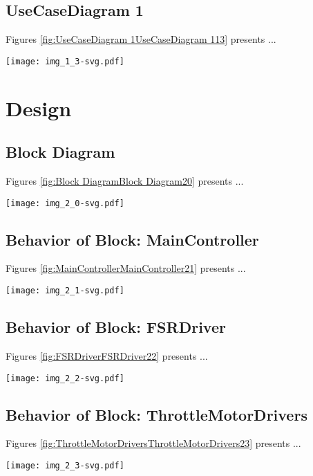 \subsection{UseCaseDiagram 1}
Figures \ref{fig:UseCaseDiagram 1UseCaseDiagram 113} presents ...
\begin{figure*}[htb]
\centering
\texttt{[image: img\_1\_3-svg.pdf]}
\caption{Diagram "UseCaseDiagram 1"}
\label{fig:UseCaseDiagram 1UseCaseDiagram 113}
\end{figure*}

\section{Design}
\subsection{Block Diagram}
Figures \ref{fig:Block DiagramBlock Diagram20} presents ...
\begin{figure*}[htb]
\centering
\texttt{[image: img\_2\_0-svg.pdf]}
\caption{Diagram "Block Diagram"}
\label{fig:Block DiagramBlock Diagram20}
\end{figure*}

\subsection{Behavior of Block: MainController}
Figures \ref{fig:MainControllerMainController21} presents ...
\begin{figure*}[htb]
\centering
\texttt{[image: img\_2\_1-svg.pdf]}
\caption{Diagram "Behavior of Block: MainController"}
\label{fig:MainControllerMainController21}
\end{figure*}

\subsection{Behavior of Block: FSRDriver}
Figures \ref{fig:FSRDriverFSRDriver22} presents ...
\begin{figure*}[htb]
\centering
\texttt{[image: img\_2\_2-svg.pdf]}
\caption{Diagram "Behavior of Block: FSRDriver"}
\label{fig:FSRDriverFSRDriver22}
\end{figure*}

\subsection{Behavior of Block: ThrottleMotorDrivers}
Figures \ref{fig:ThrottleMotorDriversThrottleMotorDrivers23} presents ...
\begin{figure*}[htb]
\centering
\texttt{[image: img\_2\_3-svg.pdf]}
\caption{Diagram "Behavior of Block: ThrottleMotorDrivers"}
\label{fig:ThrottleMotorDriversThrottleMotorDrivers23}
\end{figure*}

